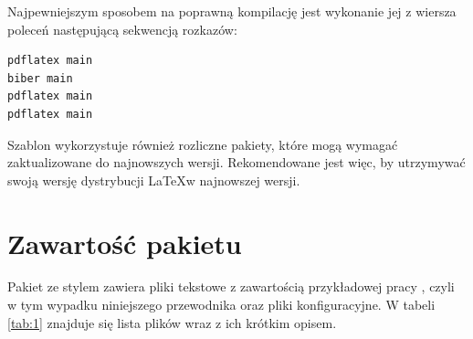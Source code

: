 
Najpewniejszym sposobem na poprawną kompilację jest wykonanie jej z wiersza poleceń następującą sekwencją rozkazów:

\begin{lstlisting}[language=bash, caption=Skrypt kompilujący, label=alg:1]
pdflatex main
biber main
pdflatex main
pdflatex main

\end{lstlisting}

Szablon wykorzystuje również rozliczne pakiety, które mogą wymagać
zaktualizowane do najnowszych wersji. Rekomendowane jest więc, by utrzymywać swoją wersję dystrybucji \LaTeX w najnowszej wersji.


\section{Zawartość pakietu}

Pakiet ze stylem zawiera pliki tekstowe z zawartością przykładowej pracy , czyli w tym wypadku niniejszego przewodnika oraz pliki konfiguracyjne. W tabeli \ref{tab:1} znajduje się lista plików wraz z ich krótkim opisem.

